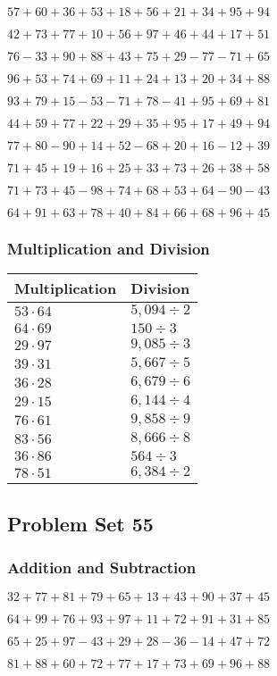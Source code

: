 \(57+60+36+53+18+56+21+34+95+ 94\)

\(42+73+77+10+56+97+46+44+17+51\)

\(76-33+90+88+43+75+29-77-71+65\)

\(96+53+74+69+11+24+13+20+34+88\)

\(93+79+15-53-71+78-41+95+69+81\)

\(44+59+77+22+29+35+95+17+49+94\)

\(77+80-90+14+52-68+20+16-12+39\)

\(71+45+19+16+25+33+73+26+38+58\)

\(71+73+45-98+74+68+53+64-90-43\)

\(64+91+63+78+40+84+66+68+96+45\)

\hypertarget{multiplication-and-division-94}{%
\subsubsection{Multiplication and
Division}\label{multiplication-and-division-94}}

\begin{longtable}[]{@{}ll@{}}
\toprule
Multiplication & Division\tabularnewline
\midrule
\endhead
\(53\cdot64\) & \(5,094÷2\)\tabularnewline
\(64\cdot69\) & \(150÷3\)\tabularnewline
\(29\cdot97\) & \(9,085÷3\)\tabularnewline
\(39\cdot31\) & \(5,667÷5\)\tabularnewline
\(36\cdot28\) & \(6,679÷6\)\tabularnewline
\(29\cdot15\) & \(6,144÷4\)\tabularnewline
\(76\cdot61\) & \(9,858÷9\)\tabularnewline
\(83\cdot56\) & \(8,666÷8\)\tabularnewline
\(36\cdot86\) & \(564÷3\)\tabularnewline
\(78\cdot51\) & \(6,384÷2\)\tabularnewline
\bottomrule
\end{longtable}

\hypertarget{problem-set-55}{%
\subsection{Problem Set 55}\label{problem-set-55}}

\hypertarget{addition-and-subtraction-95}{%
\subsubsection{Addition and
Subtraction}\label{addition-and-subtraction-95}}

\(32+77+81+79+65+13+43+90+37+ 45\)

\(64+99+76+93+97+11+72+91+31+85\)

\(65+25+97-43+29+28-36-14+47+72\)

\(81+88+60+72+77+17+73+69+96+88\)

